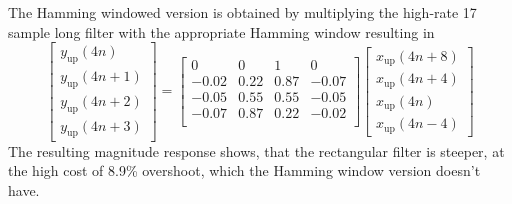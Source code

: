 The Hamming windowed version is obtained by multiplying the high-rate 17 sample long filter with the appropriate Hamming window resulting in
\begin{equation*}
  \begin{bmatrix}
    y_{\text{up}}(4n) \\
    y_{\text{up}}(4n+1) \\
    y_{\text{up}}(4n+2) \\
    y_{\text{up}}(4n+3)
  \end{bmatrix}
  =
  \begin{bmatrix}
        0 &    0 &    1 &     0 \\
    -0.02 & 0.22 & 0.87 & -0.07 \\
    -0.05 & 0.55 & 0.55 & -0.05 \\
    -0.07 & 0.87 & 0.22 & -0.02 \\
  \end{bmatrix}
  \begin{bmatrix}
    x_{\text{up}}(4n+8) \\
    x_{\text{up}}(4n+4) \\
    x_{\text{up}}(4n) \\
    x_{\text{up}}(4n-4)
  \end{bmatrix}
\end{equation*}
The resulting magnitude response shows, that the rectangular filter is steeper, at the high cost of 8.9\% overshoot, which the Hamming window version doesn't have.\\

